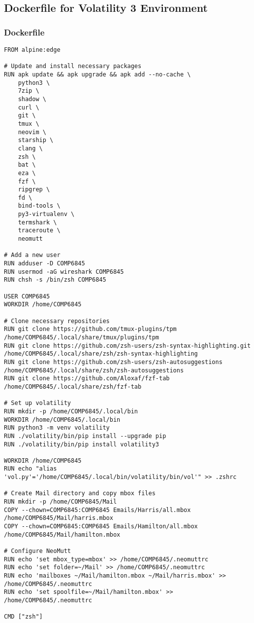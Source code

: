 \subsection{Dockerfile for Volatility 3 Environment} %
\label{sec:Dockerfile for Volatility 3 Environment}
\subsubsection{Dockerfile}
\label{subsubsec:Dockerfile}
\begin{verbatim}
FROM alpine:edge

# Update and install necessary packages
RUN apk update && apk upgrade && apk add --no-cache \
    python3 \
    7zip \
    shadow \
    curl \
    git \
    tmux \
    neovim \
    starship \
    clang \
    zsh \
    bat \
    eza \
    fzf \
    ripgrep \
    fd \
    bind-tools \
    py3-virtualenv \
    termshark \
    traceroute \
    neomutt

# Add a new user
RUN adduser -D COMP6845
RUN usermod -aG wireshark COMP6845
RUN chsh -s /bin/zsh COMP6845

USER COMP6845
WORKDIR /home/COMP6845

# Clone necessary repositories
RUN git clone https://github.com/tmux-plugins/tpm /home/COMP6845/.local/share/tmux/plugins/tpm
RUN git clone https://github.com/zsh-users/zsh-syntax-highlighting.git /home/COMP6845/.local/share/zsh/zsh-syntax-highlighting
RUN git clone https://github.com/zsh-users/zsh-autosuggestions /home/COMP6845/.local/share/zsh/zsh-autosuggestions
RUN git clone https://github.com/Aloxaf/fzf-tab /home/COMP6845/.local/share/zsh/fzf-tab

# Set up volatility
RUN mkdir -p /home/COMP6845/.local/bin
WORKDIR /home/COMP6845/.local/bin
RUN python3 -m venv volatility
RUN ./volatility/bin/pip install --upgrade pip
RUN ./volatility/bin/pip install volatility3

WORKDIR /home/COMP6845
RUN echo "alias 'vol.py'='/home/COMP6845/.local/bin/volatility/bin/vol'" >> .zshrc

# Create Mail directory and copy mbox files
RUN mkdir -p /home/COMP6845/Mail
COPY --chown=COMP6845:COMP6845 Emails/Harris/all.mbox /home/COMP6845/Mail/harris.mbox
COPY --chown=COMP6845:COMP6845 Emails/Hamilton/all.mbox /home/COMP6845/Mail/hamilton.mbox

# Configure NeoMutt
RUN echo 'set mbox_type=mbox' >> /home/COMP6845/.neomuttrc
RUN echo 'set folder=~/Mail' >> /home/COMP6845/.neomuttrc
RUN echo 'mailboxes ~/Mail/hamilton.mbox ~/Mail/harris.mbox' >> /home/COMP6845/.neomuttrc
RUN echo 'set spoolfile=~/Mail/hamilton.mbox' >> /home/COMP6845/.neomuttrc

CMD ["zsh"]
\end{verbatim}

